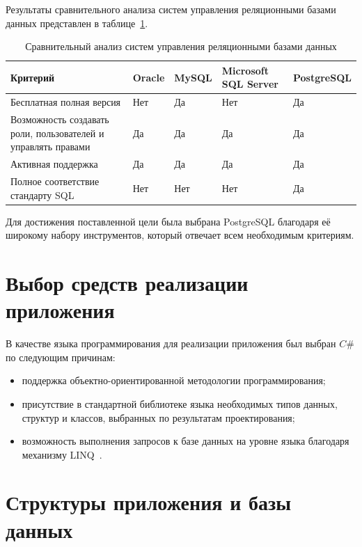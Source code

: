 Результаты сравнительного анализа систем управления реляционными базами данных представлен в таблице~\ref{tbl:subd-compare}.

\newpage

\begin{table}[h]
	\centering
	\caption{Сравнительный анализ систем управления реляционными базами данных}
	\label{tbl:subd-compare}
	\begin{tabularx}{\textwidth}{|p{3.5cm}|X|X|X|X|}
		\hline
		\textbf{Критерий} & \textbf{Oracle} & \textbf{MySQL} & \textbf{Microsoft SQL Server} & \textbf{PostgreSQL} \\
		\hline
		Бесплатная полная версия & Нет & Да & Нет & Да \\
		\hline
		Возможность создавать роли, пользователей и управлять правами & Да & Да & Да & Да \\
		\hline
		Активная поддержка & Да & Да & Да & Да \\
		\hline
		Полное соответствие стандарту SQL & Нет & Нет  & Нет & Да \\
		\hline
	\end{tabularx}
\end{table}

Для достижения поставленной цели была выбрана PostgreSQL благодаря её широкому набору инструментов, который отвечает всем необходимым критериям.

\section{Выбор средств реализации приложения}

В качестве языка программирования для реализации приложения был выбран $C\#$ по следующим причинам:
\begin{itemize}[label=--]
	\item поддержка объектно-ориентированной методологии программирования;
	\item присутствие в стандартной библиотеке языка необходимых типов данных, структур и классов, выбранных по результатам проектирования;
	\item возможность выполнения запросов к базе данных на уровне языка благодаря механизму LINQ~\cite{lit16}.
\end{itemize}

\section{Структуры приложения и базы данных}

